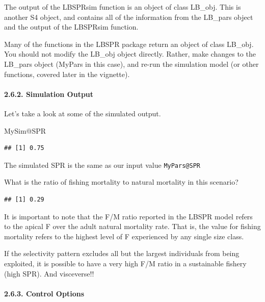 \documentclass[
]{article}
\newenvironment{Shaded}{\begin{snugshade}}{\end{snugshade}}
\newcommand{\NormalTok}[1]{#1}
\newcommand{\SpecialCharTok}[1]{\textcolor[rgb]{0.00,0.00,0.00}{#1}}
\begin{document}
The output of the LBSPRsim function is an object of class LB\_obj. This
is another S4 object, and contains all of the information from the
LB\_pars object and the output of the LBSPRsim function.

Many of the functions in the LBSPR package return an object of class
LB\_obj. You should not modify the LB\_obj object directly. Rather, make
changes to the LB\_pars object (MyPars in this case), and re-run the
simulation model (or other functions, covered later in the vignette).

\hypertarget{simulation-output}{%
\paragraph{2.6.2. Simulation Output}\label{simulation-output}}

Let's take a look at some of the simulated output.

\begin{Shaded}
\begin{Highlighting}[]
\NormalTok{MySim}\SpecialCharTok{@}\NormalTok{SPR }
\end{Highlighting}
\end{Shaded}

\begin{verbatim}
## [1] 0.75
\end{verbatim}

The simulated SPR is the same as our input value \texttt{MyPars@SPR}

What is the ratio of fishing mortality to natural mortality in this
scenario?

\begin{verbatim}
## [1] 0.29
\end{verbatim}

It is important to note that the F/M ratio reported in the LBSPR model
refers to the apical F over the adult natural mortality rate. That is,
the value for fishing mortality refers to the highest level of F
experienced by any single size class.

If the selectivity pattern excludes all but the largest individuals from
being exploited, it is possible to have a very high F/M ratio in a
sustainable fishery (high SPR). And visceverse!!

\hypertarget{control-options}{%
\paragraph{2.6.3. Control Options}\label{control-options}}
\end{document}
